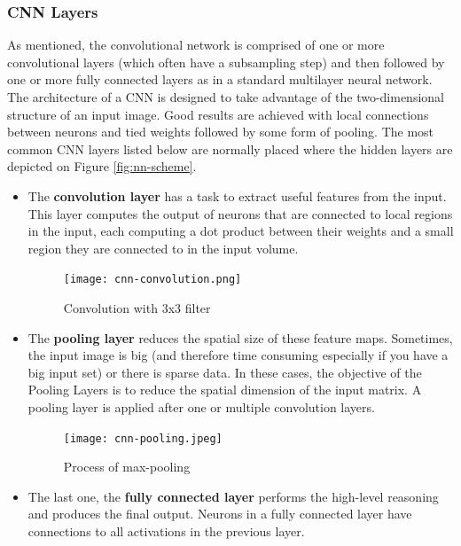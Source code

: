 \documentclass[../Main.tex]{subfiles}
\begin{document}
    \subsubsection{CNN Layers}
    As mentioned, the convolutional network is comprised of one or more convolutional layers (which often have a subsampling step) and then followed by one or more fully connected layers as in a standard multilayer neural network. The architecture of a CNN is designed to take advantage of the two-dimensional structure of an input image. Good results are achieved with local connections between neurons and tied weights followed by some form of pooling.  The most common CNN layers listed below are normally placed where the hidden layers are depicted on Figure \ref{fig:nn-scheme}. 
    \begin{itemize}
        \item The \textbf{convolution layer} has a task to extract useful features from the input. This layer computes the output of neurons that are connected to local regions in the input, each computing a dot product between their weights and a small region they are connected to in the input volume.  \\
    \begin{figure}[h!]
        \centering
        \texttt{[image: cnn-convolution.png]}
        \caption{Convolution with 3x3 filter}
        \label{fig:cnn-convolution}
    \end{figure}
    
        \item The \textbf{pooling layer} reduces the spatial size of these feature maps. Sometimes, the input image is big (and therefore time consuming especially if you have a big input set) or there is sparse data. In these cases, the objective of the Pooling Layers is to reduce the spatial dimension of the input matrix. A pooling layer is applied after one or multiple convolution layers.\\
    \begin{figure}[h!]
        \centering
        \texttt{[image: cnn-pooling.jpeg]}
        \caption{Process of max-pooling}
        \label{fig:cnn-pooling}
    \end{figure}
    
        \item The last one, the \textbf{fully connected layer} performs the high-level reasoning and produces the final output. Neurons in a fully connected layer have connections to all activations in the previous layer.
    \end{itemize}
    
\end{document}
